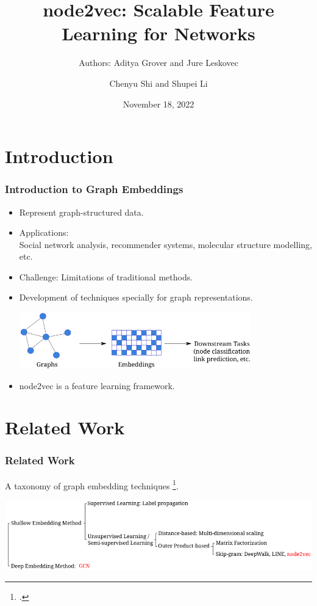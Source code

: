 \documentclass[notes, 10pt, aspectratio=169]{beamer}
\title{node2vec: Scalable Feature Learning for Networks}
\subtitle{Authors: Aditya Grover and Jure Leskovec}
\author{Chenyu Shi and Shupei Li}
\institute[LIACS]{Leiden Institute of Advanced Computer Science}
\date{November 18, 2022}
\begin{document}
\begin{frame}[plain]
	\titlepage
\end{frame}

\begin{frame}
	\tableofcontents
\end{frame}

\section{Introduction}
\begin{frame}
    \frametitle{Introduction to Graph Embeddings}
    \begin{itemize}
        \item Represent graph-structured data.
        \item Applications: \\
            Social network analysis, recommender systems, molecular structure modelling, etc.
        \item Challenge: Limitations of traditional methods.
        \item Development of techniques specially for graph representations.\vspace{0.2cm}
            \begin{center}
                \includegraphics[width=10cm]{./graphics/intro.png}
            \end{center}
        \item node2vec is a feature learning framework.
    \end{itemize}
\end{frame}

\section{Related Work}
\begin{frame}
    \frametitle{Related Work}
    A taxonomy of graph embedding techniques \footcite{murphy2022}.
    \begin{center}
        \includegraphics[width=14cm]{./graphics/related-work.png}
    \end{center}
\end{frame}
\end{document}
